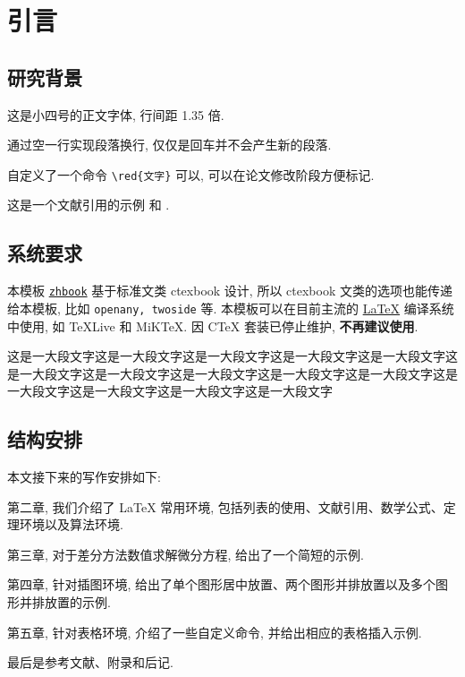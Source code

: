 


\chapter{引言}\label{chap:Intro}

\section{研究背景}\label{sec:background}

这是小四号的正文字体, 行间距 1.35 倍.

通过空一行实现段落换行, 仅仅是回车并不会产生新的段落.

自定义了一个命令 \verb|\red{文字}| 可以, 可以在论文修改阶段方便标记.

这是一个文献引用的示例 \cite{Tadmor2012} 和 \cite{LiLiu1997,Adams2003,TreWei2014}.

\section{系统要求}
本模板 \href{https://github.com/andy123t/zhbook}{\texttt{zhbook}} 基于标准文类 ctexbook 设计, 所以 ctexbook 文类的选项也能传递给本模板, 比如 \lstinline{openany, twoside} 等. 本模板可以在目前主流的 \href{https://en.wikibooks.org/wiki/LaTeX/Introduction}{\LaTeX{}} 编译系统中使用, 如 \TeX{}Live 和 MiK\TeX{}. 因 C\TeX{} 套装已停止维护, \textbf{不再建议使用}.

这是一大段文字这是一大段文字这是一大段文字这是一大段文字这是一大段文字这是一大段文字这是一大段文字这是一大段文字这是一大段文字这是一大段文字这是一大段文字这是一大段文字这是一大段文字这是一大段文字


\section{结构安排}

本文接下来的写作安排如下:

第二章, 我们介绍了 LaTeX 常用环境, 包括列表的使用、文献引用、数学公式、定理环境以及算法环境.

第三章, 对于差分方法数值求解微分方程, 给出了一个简短的示例.

第四章, 针对插图环境, 给出了单个图形居中放置、两个图形并排放置以及多个图形并排放置的示例.

第五章, 针对表格环境, 介绍了一些自定义命令, 并给出相应的表格插入示例.

最后是参考文献、附录和后记.


